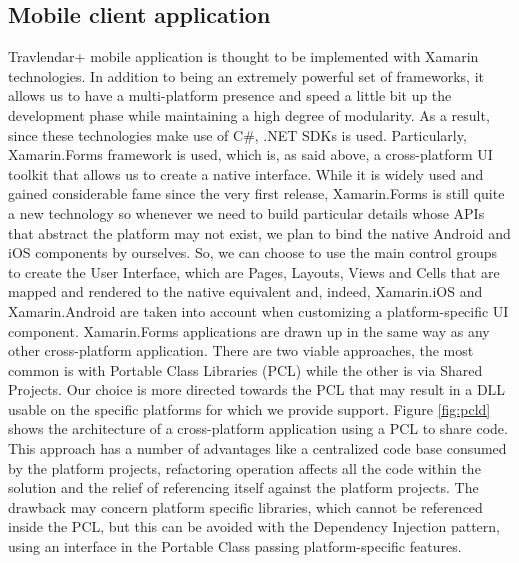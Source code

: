 \subsection*{Mobile client application}
Travlendar+ mobile application is thought to be implemented with Xamarin technologies. In addition to being an extremely powerful set of frameworks, it allows us to have a multi-platform presence and speed a little bit up the development phase while maintaining a high degree of modularity.
As a result, since these technologies make use of C\#, .NET SDKs is used. Particularly, Xamarin.Forms framework is used, which is, as said above, a cross-platform UI toolkit that allows us to create a native interface. While it is widely used and gained considerable fame since the very first release, Xamarin.Forms is still quite a new technology so whenever we need to build particular details whose APIs that abstract the platform may not exist, we plan to bind the native Android and iOS components by ourselves. So, we can choose to use the main control groups to create the User Interface, which are Pages, Layouts, Views and Cells that are mapped and rendered to the native equivalent and, indeed, Xamarin.iOS and Xamarin.Android are taken into account when customizing a platform-specific UI component. Xamarin.Forms applications are drawn up in the same way as any other cross-platform application. There are two viable approaches, the most common is with Portable Class Libraries (PCL) while the other is via Shared Projects.
Our choice is more directed towards the PCL that may result in a DLL usable on the specific platforms for which we provide support. Figure \ref{fig:pcld} shows the architecture of a cross-platform application using a PCL to share code. This approach has a number of advantages like a centralized code base consumed by the platform projects, refactoring operation affects all the code within the solution and the relief of referencing itself against the platform projects. 
The drawback may concern platform specific libraries, which cannot be referenced inside the PCL, but this can be avoided with the Dependency Injection pattern, using an interface in the Portable Class passing platform-specific features.

